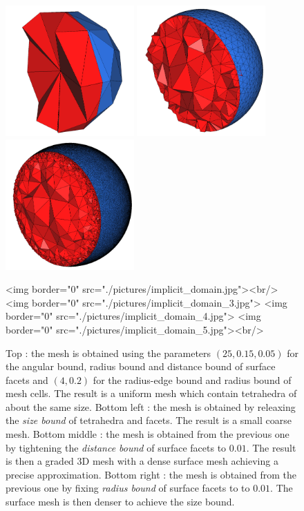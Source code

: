 \begin{figure}[ht]
\begin{center}
\begin{ccTexOnly}
   \includegraphics[height=5cm]{Mesh_3/pictures/implicit_domain_3}
   \includegraphics[height=5cm]{Mesh_3/pictures/implicit_domain_4}
   \includegraphics[height=5cm]{Mesh_3/pictures/implicit_domain_5}
 \end{ccTexOnly}
 \begin{ccHtmlOnly}
   <img border="0" src="./pictures/implicit_domain.jpg"><br/>
   <img border="0" src="./pictures/implicit_domain_3.jpg">
   <img border="0" src="./pictures/implicit_domain_4.jpg">
   <img border="0" src="./pictures/implicit_domain_5.jpg"><br/>
 \end{ccHtmlOnly}
 \caption{Top : the mesh  is obtained using the parameters $(25,0.15,0.05)$ for the angular bound,
radius bound and distance bound of  surface facets
and 
$(4,0.2)$ for  the radius-edge bound and radius  bound of mesh cells. The result is a  uniform mesh which contain tetrahedra
of about the same size. 
Bottom  left :
the mesh  is obtained by releaxing the \emph{ size bound} of tetrahedra
and facets.
 The result is a small coarse mesh. 
Bottom middle : the mesh  is obtained from the previous one  by tightening the \emph{distance bound} 
of surface facets to
$0.01$. The result is then a graded 3D mesh with a dense surface mesh
achieving a precise approximation. 
Bottom right :
the mesh  is obtained from the previous one  by fixing \emph{radius bound} of surface facets to
to $0.01$. The surface mesh is then denser to achieve the size bound.}
  \label{figure:parameters}
\end{center}
\end{figure}




